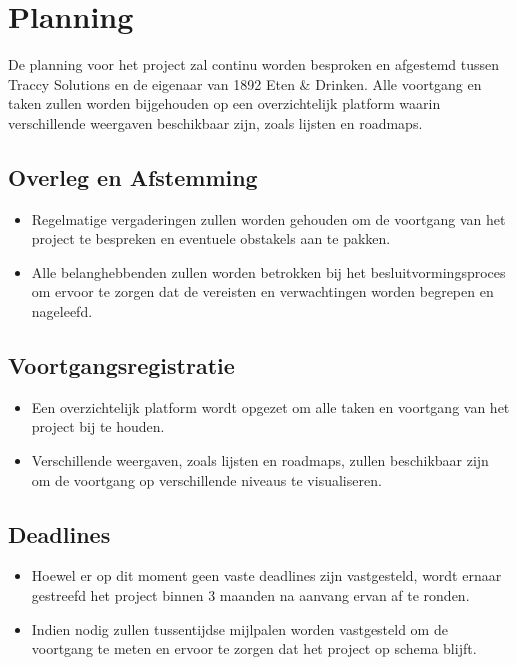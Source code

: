 \section{Planning}
De planning voor het project zal continu worden besproken en afgestemd tussen Traccy Solutions en de eigenaar van 1892 Eten \& Drinken. Alle voortgang en taken zullen worden bijgehouden op een overzichtelijk platform waarin verschillende weergaven beschikbaar zijn, zoals lijsten en roadmaps.

\subsection{Overleg en Afstemming}
\begin{itemize}
    \item Regelmatige vergaderingen zullen worden gehouden om de voortgang van het project te bespreken en eventuele obstakels aan te pakken.
    \item Alle belanghebbenden zullen worden betrokken bij het besluitvormingsproces om ervoor te zorgen dat de vereisten en verwachtingen worden begrepen en nageleefd.
\end{itemize}

\subsection{Voortgangsregistratie}
\begin{itemize}
    \item Een overzichtelijk platform wordt opgezet om alle taken en voortgang van het project bij te houden.
    \item Verschillende weergaven, zoals lijsten en roadmaps, zullen beschikbaar zijn om de voortgang op verschillende niveaus te visualiseren.
\end{itemize}

\subsection{Deadlines}
\begin{itemize}
    \item Hoewel er op dit moment geen vaste deadlines zijn vastgesteld, wordt ernaar gestreefd het project binnen 3 maanden na aanvang ervan af te ronden.
    \item Indien nodig zullen tussentijdse mijlpalen worden vastgesteld om de voortgang te meten en ervoor te zorgen dat het project op schema blijft.
\end{itemize}
